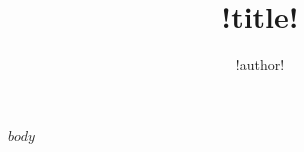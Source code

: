 \documentclass{article}
\title{!title!}
\author{!author!}
\begin{document}
\maketitle %


  $body$
\end{document}
